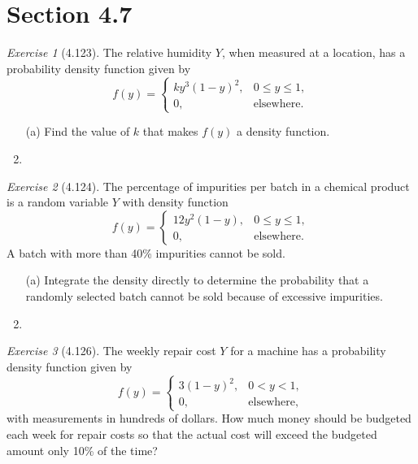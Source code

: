\documentclass[12pt]{amsart}
\makeatletter
\theoremstyle{remark}
\newtheorem*{exercise}{Exercise}%
\renewenvironment{proof}[1][\proofname]{\par\doublespacing
  \pushQED{\qed}%
  \normalfont \topsep6\p@\@plus6\p@\relax
  \list{}{%
    \settowidth{\leftmargin}{\itshape\proofname:\hskip\labelsep}%
    \setlength{\labelwidth}{0pt}%
    \setlength{\itemindent}{-\leftmargin}%
  }%
  \item[\hskip\labelsep\itshape#1\@addpunct{:}]\ignorespaces
}{%
  \popQED\endlist\@endpefalse
  \singlespacing
}
\theoremstyle{mycomment}
\makeatother
\begin{document}
\section*{Section 4.7}
\begin{exercise}[4.123]
The relative humidity $Y$, when measured at a location, has a probability density function given by
$$f(y) = \begin{cases}
ky^3(1 - y)^2, & 0 \leq y \leq 1, \\
0, & \text{elsewhere}.
\end{cases}$$

\begin{enumerate}
    \item[(a)] Find the value of $k$ that makes $f(y)$ a density function.
\begin{proof}[Solution]
 
\end{proof}
\end{enumerate}
\end{exercise}

\begin{exercise}[4.124]
The percentage of impurities per batch in a chemical product is a random variable $Y$ with density function
$$f(y) = \begin{cases}
12y^2(1 - y), & 0 \leq y \leq 1, \\
0, & \text{elsewhere}.
\end{cases}$$
A batch with more than 40\% impurities cannot be sold.

\begin{enumerate}
    \item[(a)] Integrate the density directly to determine the probability that a randomly selected batch cannot be sold because of excessive impurities.
\begin{proof}[Solution]
 
\end{proof}
\end{enumerate}
\end{exercise}

\begin{exercise}[4.126]
The weekly repair cost $Y$ for a machine has a probability density function given by
$$f(y) = \begin{cases}
3(1 - y)^2, & 0 < y < 1, \\
0, & \text{elsewhere},
\end{cases}$$
with measurements in hundreds of dollars. How much money should be budgeted each week for repair costs so that the actual cost will exceed the budgeted amount only 10\% of the time?

\begin{proof}[Solution]
 
\end{proof}
\end{exercise}
\end{document}
